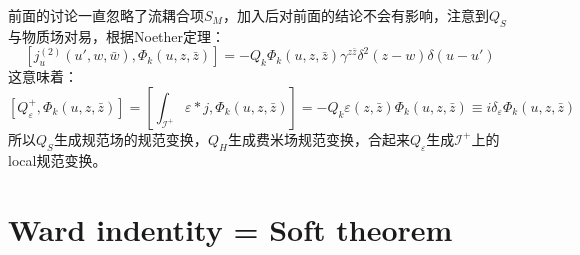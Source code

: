 前面的讨论一直忽略了流耦合项$S_M$，加入后对前面的结论不会有影响，注意到$Q_S$与物质场对易，根据Noether定理：
\begin{equation}
	\left[j_{u}^{(2)}(u',w,\bar{w}),\Phi_{k}(u,z,\bar{z})\right]=-Q_{k}\Phi_{k}(u,z,\bar{z})\gamma^{z\bar{z}}\delta^{2}(z-w)\delta(u-u')
\end{equation}
这意味着：
\begin{equation}\label{23.36}
	\left[Q_\varepsilon^+,\Phi_k(u,z,\bar{z})\right]=\left[\int_{\mathcal{I}^+}\varepsilon*j,\Phi_k(u,z,\bar{z})\right]=-Q_k\varepsilon(z,\bar{z})\Phi_k(u,z,\bar{z})\equiv i\delta_\varepsilon\Phi_k(u,z,\bar{z})
\end{equation}
所以$Q_S$生成规范场的规范变换，$Q_H$生成费米场规范变换，合起来$Q_\varepsilon$生成$\mathcal{I}^+$上的local规范变换。
\section{Ward indentity = Soft theorem}
